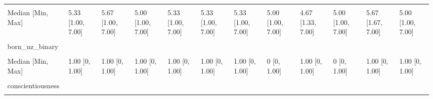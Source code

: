 \documentclass[
  single column]{article}
\begin{document}
\begin{landscape}
\begin{longtable}[t]{llllllllllll}
\cellcolor{gray!10}{Mean (SD)} & \cellcolor{gray!10}{5.11 (1.14)} & \cellcolor{gray!10}{5.37 (1.05)} & \cellcolor{gray!10}{4.99 (1.24)} & \cellcolor{gray!10}{5.26 (1.11)} & \cellcolor{gray!10}{5.19 (1.13)} & \cellcolor{gray!10}{5.23 (1.15)} & \cellcolor{gray!10}{4.99 (1.21)} & \cellcolor{gray!10}{4.65 (1.16)} & \cellcolor{gray!10}{4.83 (1.21)} & \cellcolor{gray!10}{5.38 (1.03)} & \cellcolor{gray!10}{4.84 (1.30)}\\
Median [Min, Max] & 5.33 [1.00, 7.00] & 5.67 [1.00, 7.00] & 5.00 [1.00, 7.00] & 5.33 [1.00, 7.00] & 5.33 [1.00, 7.00] & 5.33 [1.00, 7.00] & 5.00 [1.00, 7.00] & 4.67 [1.33, 7.00] & 5.00 [1.00, 7.00] & 5.67 [1.67, 7.00] & 5.00 [1.00, 7.00]\\
\addlinespace
\cellcolor{gray!10}{Missing} & \cellcolor{gray!10}{103 (0.5\%)} & \cellcolor{gray!10}{11 (0.8\%)} & \cellcolor{gray!10}{2 (0.7\%)} & \cellcolor{gray!10}{11 (0.5\%)} & \cellcolor{gray!10}{23 (0.6\%)} & \cellcolor{gray!10}{3 (0.3\%)} & \cellcolor{gray!10}{0 (0\%)} & \cellcolor{gray!10}{2 (2.3\%)} & \cellcolor{gray!10}{3 (0.5\%)} & \cellcolor{gray!10}{1 (0.2\%)} & \cellcolor{gray!10}{7 (0.9\%)}\\
born\_nz\_binary &  &  &  &  &  &  &  &  &  &  & \\
\cellcolor{gray!10}{Mean (SD)} & \cellcolor{gray!10}{0.794 (0.405)} & \cellcolor{gray!10}{0.831 (0.375)} & \cellcolor{gray!10}{0.587 (0.493)} & \cellcolor{gray!10}{0.786 (0.410)} & \cellcolor{gray!10}{0.776 (0.417)} & \cellcolor{gray!10}{0.747 (0.435)} & \cellcolor{gray!10}{0.441 (0.498)} & \cellcolor{gray!10}{0.667 (0.474)} & \cellcolor{gray!10}{0.230 (0.421)} & \cellcolor{gray!10}{0.890 (0.313)} & \cellcolor{gray!10}{0.779 (0.415)}\\
Median [Min, Max] & 1.00 [0, 1.00] & 1.00 [0, 1.00] & 1.00 [0, 1.00] & 1.00 [0, 1.00] & 1.00 [0, 1.00] & 1.00 [0, 1.00] & 0 [0, 1.00] & 1.00 [0, 1.00] & 0 [0, 1.00] & 1.00 [0, 1.00] & 1.00 [0, 1.00]\\
\cellcolor{gray!10}{Missing} & \cellcolor{gray!10}{25 (0.1\%)} & \cellcolor{gray!10}{2 (0.1\%)} & \cellcolor{gray!10}{1 (0.4\%)} & \cellcolor{gray!10}{1 (0.0\%)} & \cellcolor{gray!10}{10 (0.3\%)} & \cellcolor{gray!10}{0 (0\%)} & \cellcolor{gray!10}{0 (0\%)} & \cellcolor{gray!10}{0 (0\%)} & \cellcolor{gray!10}{37 (5.6\%)} & \cellcolor{gray!10}{1 (0.2\%)} & \cellcolor{gray!10}{2 (0.3\%)}\\
\addlinespace
conscientiousness &  &  &  &  &  &  &  &  &  &  & \\
\cellcolor{gray!10}{Mean (SD)} & \cellcolor{gray!10}{5.01 (1.11)} & \cellcolor{gray!10}{5.21 (1.01)} & \cellcolor{gray!10}{5.06 (1.11)} & \cellcolor{gray!10}{5.22 (1.07)} & \cellcolor{gray!10}{5.09 (1.04)} & \cellcolor{gray!10}{5.09 (1.04)} & \cellcolor{gray!10}{5.25 (1.02)} & \cellcolor{gray!10}{4.91 (1.16)} & \cellcolor{gray!10}{5.02 (1.08)} & \cellcolor{gray!10}{5.15 (1.01)} & \cellcolor{gray!10}{4.91 (1.17)}\\

\end{longtable}
\end{landscape}
\end{document}
